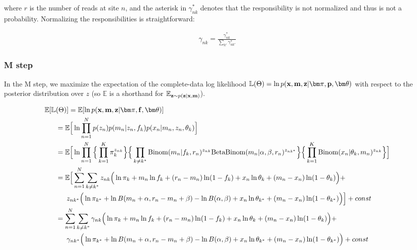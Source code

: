 \documentclass[a4paper]{article}
\newcommand{\vf}{{\bf f}}
\newcommand{\vp}{{\bf p}}
\newcommand{\vz}{{\bf z}}
\newcommand{\vm}{{\bf m}}
\newcommand{\vx}{{\bf x}}
\newcommand{\vpi}{{\bm \pi}}
\newcommand{\vtheta}{{\bm \theta}}
\newcommand{\E}{\mathbb{E}}
\newcommand{\LL}{\mathbb{L}}
\begin{document}
where $r$ is the number of reads at site $n$, and the asterisk in $\gamma^*_{nk}$ denotes that the responsibility is not normalized and thus is not a probability. Normalizing the responsibilities is straightforward:

\begin{align}
\gamma_{nk} = \frac{\gamma^*_{nk}}{\sum_{k'} \gamma^*_{nk'}} \label{eq:normalize}
\end{align}

\subsubsection{M step}
In the M step, we maximize the expectation of the complete-data log likelihood $\LL (\Theta) = \ln p(\vx, \vm, \vz | \vpi, \vp, \vtheta)$ with respect to the posterior distribution over $z$ (so $\E$ is a shorthand for $\E_{\vz \sim p(\vz|\vx,\vm)}$). 

\begin{align}
\E [ \LL &(\Theta) ] = \E [ \ln p(\vx, \vm , \vz | \vpi, \vf, \vtheta) ] \nonumber \\
           &= \E \Big [ \ln \prod_{n = 1}^{N}  p(z_n) p(m_n | z_n, f_{k} ) p(x_n | m_n, z_n, \theta_k ) \Big ] \nonumber \\
           &= \E \Big [ \ln \prod_{n = 1}^{N} \Big \{ \prod_{k = 1}^{K} \pi_{k}^{z_{nk}} \Big \} \Big \{ \prod_{k \neq k^*} \mathrm{Binom}(m_n | f_k, r_n)^{z_{nk}} \mathrm{BetaBinom}(m_n | \alpha, \beta, r_n)^{z_{nk^*}} \Big \} \Big \{ \prod_{k = 1}^{K} \mathrm{Binom}(x_n | \theta_k, m_n) ^{z_{nk}} \Big \} \Big ] \notag \\
            &= \E \Big [ \sum_{n = 1}^{N} \sum_{k \neq k^*} z_{nk} \Big ( \ln \pi_{k}  + m_n \ln f_k + (r_n - m_n) \ln (1-f_k) + x_n \ln \theta_k + (m_n - x_n) \ln (1 - \theta_k) \Big )  + \notag \\
            &\phantom{--} z_{nk^*} \Big ( \ln \pi_{k^*} + \ln B(m_n + \alpha, r_n - m_n + \beta) - \ln B(\alpha, \beta) + x_n \ln \theta_{k^*} + (m_n - x_n) \ln (1 - \theta_{k^*}) \Big ) \Big ] + const \nonumber \\
            &= \sum_{n = 1}^{N} \sum_{k \neq k^*} \gamma_{nk} \Big ( \ln \pi_{k}  + m_n \ln f_k + (r_n - m_n) \ln (1-f_k) + x_n \ln \theta_k + (m_n - x_n) \ln (1 - \theta_k) \Big )  + \notag \\
            &\phantom{--} \gamma_{nk^*} \Big ( \ln \pi_{k^*} + \ln B(m_n + \alpha, r_n - m_n + \beta) - \ln B(\alpha, \beta) + x_n \ln \theta_{k^*} + (m_n - x_n) \ln (1 - \theta_{k^*}) \Big ) + const  \label{eq:expjointLL}
\end{align} 
\end{document}
